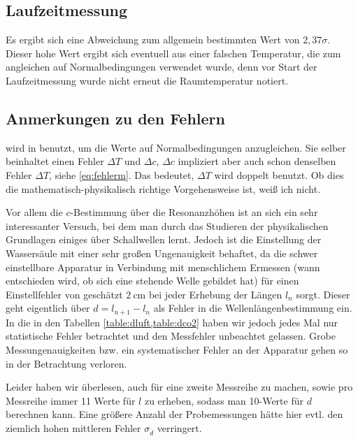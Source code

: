 \subsection{Laufzeitmessung}
Es ergibt sich eine Abweichung zum allgemein bestimmten Wert von \(2,37\sigma\). Dieser hohe Wert ergibt sich eventuell aus einer falschen Temperatur, die zum angleichen auf Normalbedingungen verwendet wurde, denn vor Start der Laufzeitmessung wurde nicht erneut die Raumtemperatur notiert.

\subsection{Anmerkungen zu den Fehlern}  
 wird in  benutzt, um die Werte auf Normalbedingungen anzugleichen. Sie selber beinhaltet einen Fehler \(\Delta T\) und \(\Delta c\), \(\Delta c\) impliziert aber auch schon denselben Fehler \(\Delta T\), siehe \cref{eq:fehlerm}. Das bedeutet, \(\Delta T\) wird doppelt benutzt. Ob dies die mathematisch-physikalisch richtige Vorgehensweise ist, weiß ich nicht. 

Vor allem die \(c\)-Bestimmung über die Resonanzhöhen ist an sich ein sehr interessanter Versuch, bei dem man durch das Studieren der physikalischen Grundlagen einiges über Schallwellen lernt. Jedoch ist die Einstellung der Wassersäule mit einer sehr großen Ungenauigkeit behaftet, da die schwer einstellbare Apparatur in Verbindung mit menschlichem Ermessen (wann entschieden wird, ob sich eine stehende Welle gebildet hat) für einen Einstellfehler von geschätzt \(\qty{2}{\cm}\) bei jeder Erhebung der Längen \(l_n\) sorgt. Dieser geht eigentlich über \(d=l_{n+1}-l_n\) als Fehler in die Wellenlängenbestimmung ein. In die in den Tabellen \cref{table:dluft,table:dco2} haben wir jedoch jedes Mal nur statistische Fehler betrachtet und den Messfehler unbeachtet gelassen. Grobe Messungenauigkeiten bzw. ein systematischer Fehler an der Apparatur gehen so in der Betrachtung verloren.

Leider haben wir überlesen, auch für  eine zweite Messreihe zu machen, sowie pro Messreihe immer 11 Werte für \(l\) zu erheben, sodass man 10-Werte für \(d\) berechnen kann. Eine größere Anzahl der Probemessungen hätte hier evtl. den ziemlich hohen mittleren Fehler \(\sigma_{\overline{d}}\) verringert.
